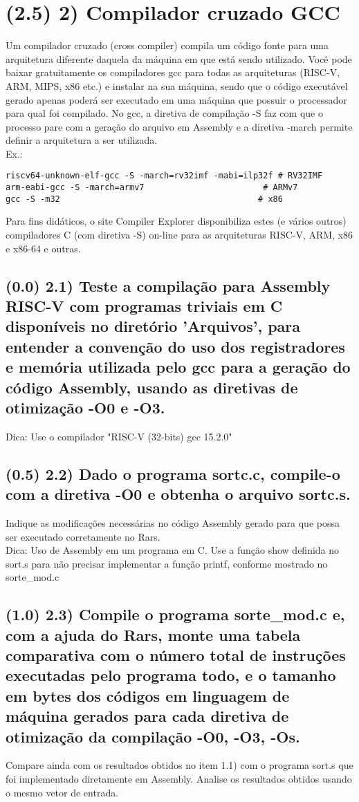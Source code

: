 \documentclass{article}
\begin{document}
\section*{(2.5) 2) Compilador cruzado GCC}
Um compilador cruzado (cross compiler) compila um código fonte para uma arquitetura diferente daquela da máquina em que está sendo utilizado.
Você pode baixar gratuitamente os compiladores gcc para todas as arquiteturas (RISC-V, ARM, MIPS, x86 etc.) e instalar na sua máquina, sendo que o código executável gerado apenas poderá ser executado em uma máquina que possuir o processador para qual foi compilado.
No gcc, a diretiva de compilação -S faz com que o processo pare com a geração do arquivo em Assembly e a diretiva -march permite definir a arquitetura a ser utilizada. \\
Ex.:
\begin{verbatim}
riscv64-unknown-elf-gcc -S -march=rv32imf -mabi=ilp32f # RV32IMF
arm-eabi-gcc -S -march=armv7                        # ARMv7
gcc -S -m32                                        # x86
\end{verbatim}
Para fins didáticos, o site Compiler Explorer disponibiliza estes (e vários outros) compiladores C (com diretiva -S) on-line para as arquiteturas RISC-V, ARM, x86 e x86-64 e outras.

\subsection*{(0.0) 2.1) Teste a compilação para Assembly RISC-V com programas triviais em C disponíveis no diretório 'Arquivos', para entender a convenção do uso dos registradores e memória utilizada pelo gcc para a geração do código Assembly, usando as diretivas de otimização -O0 e -O3.}
Dica: Use o compilador "RISC-V (32-bits) gcc 15.2.0"

\subsection*{(0.5) 2.2) Dado o programa sortc.c, compile-o com a diretiva -O0 e obtenha o arquivo sortc.s.}
Indique as modificações necessárias no código Assembly gerado para que possa ser executado corretamente no Rars. \\
Dica: Uso de Assembly em um programa em C. Use a função show definida no sort.s para não precisar implementar a função printf, conforme mostrado no sorte\_mod.c

\subsection*{(1.0) 2.3) Compile o programa sorte\_mod.c e, com a ajuda do Rars, monte uma tabela comparativa com o número total de instruções executadas pelo programa todo, e o tamanho em bytes dos códigos em linguagem de máquina gerados para cada diretiva de otimização da compilação -O0, -O3, -Os.}
Compare ainda com os resultados obtidos no item 1.1) com o programa sort.s que foi implementado diretamente em Assembly. Analise os resultados obtidos usando o mesmo vetor de entrada.
\end{document}
